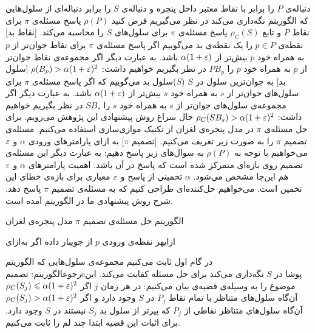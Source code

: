 دنباله‌ی $P$ را برابر با نقاط معتبر داخل پنجره و دنباله‌ی $S$ را برابر دنباله‌‌ای از سلول‌هایی که الگوریتم نگه‌داری می‌کند در نظر می‌گیریم  فرض کنید $\rho(P)$ پاسخ مسئله‌ی $\pi$ برای نقاط $P$ و تابع $\rho_C(S)$ پاسخ مسئله‌ی $\pi$ برای سلول‌های $S$ را محاسبه می‌کند. 
[نقاط بد] نقطه‌ی $p \in P$ را یک نقطه‌ی بد می‌گوییم اگر پاسخ مسئله‌ی $\pi$ برای نقاط جوان‌تر از $p$ به همراه خود $p$ بیش‌تر از $\alpha (1+\varepsilon)$ باشد. به عبارت دیگر اگر مجموعه‌ی نقاط جوان‌تر از $p$ به همراه خود $p$ را $PB_p$ در نظر بگیریم خواهیم داشت:
$ \rho(B_p) > \alpha (1+\varepsilon)^2$
[سلول بد] به جوان‌ترین سلول در $S$  ($S$)سلول بد می‌گوییم که اگر پاسخ مسئله‌ی $\pi$ برای سلول‌های جوان‌تر از $s$ به همراه خود $s$ بیش‌تر از $\alpha (1+\varepsilon)$ باشد. به عبارت دیگر اگر مجموعه‌ی سلول‌های جوان‌تر از $s$ به همراه خود $s$ را $SB_s$ در نظر بگیریم خواهیم داشت:
$ \rho_C(SB_s) > \alpha (1+\varepsilon)^2$
حال سراغ روش پیشنهادی این پژوهش می‌رویم. برای حل مسئله‌ی $\pi$ در مدل پنجره‌ی لغزان از تکنیک موازی‌سازی استفاده می‌کنیم. مسئله‌ی تصمیم $\pi$ را به صورت زیر تعریف می‌کنیم.
[تصمیم $\pi$]
به ازای پارامترهای ورودی $\alpha$ و $\varepsilon$ می‌خواهیم با توجه به $\rho(P)$ به سوال‌های زیر پاسخ دهیم:
به عبارت دیگر این مسئله‌ی تصمیم روی بازه‌ای متمرکز شده است که پاسخ در آن باشد. اهمیت پارامتر‌های $\alpha$ و $\varepsilon$ هم این‌جا مشخص می‌شود. $\alpha$ تخمینی از پاسخ  و $\varepsilon$ معیاری برای بازه‌‌ی خطای این تخمین است. می‌خواهیم حل‌کننده‌ای طراحی کنیم که به مسئله‌ی تصمیم $\pi$ پاسخ دهد.  شرح روش پیشنهادی ما در الگوریتم  آمده است.

\caption
{الگوریتم حل مسئله‌ی تصمیم $\pi$ مدل پنجره‌ی لغزان}
‌ازای{هر نقطه‌ی ورودی $p$ از جویبار داده}
 
‌اگر{}
‌به‌ازای{}

در گام اول ثابت می‌کنیم مجموعه‌ی سلول‌هایی که الگوریتم \\رجوع{الگوریتم: تصمیمcپوشا} در $S$ نگه‌داری می‌کند برای حل مسئله کفایت می‌کند. این موضوع را به وسیله‌ی قضیه‌ی  بیان می‌کنیم:
در هر زمان $j$ اگر
$\rho_C(S_j) \leqslant \alpha (1+\varepsilon)^2 $ 
آن‌‌گاه سلول‌های متناظر با تمام نقاط $P_j$ در $S$ وجود دارد و اگر
$\rho_C(S_j) > \alpha (1+\varepsilon)^2 $ 
آن‌گاه سلول‌های متناظر نقاطی از $P_j$ که پیرتر از سلول بد $S_j$ نیستند در $S$ وجود دارد.
برای اثبات این قضیه ابتدا چند لم را ثابت می‌کنیم.

